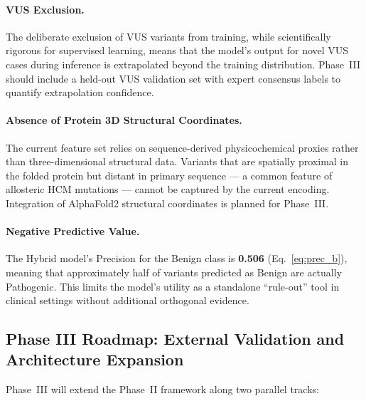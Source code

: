 \documentclass[12pt,a4paper]{article}
\begin{document}
\paragraph{VUS Exclusion.}
The deliberate exclusion of VUS variants from training, while scientifically
rigorous for supervised learning, means that the model's output for novel
VUS cases during inference is extrapolated beyond the training distribution.
Phase~III should include a held-out VUS validation set with expert consensus
labels to quantify extrapolation confidence.

\paragraph{Absence of Protein 3D Structural Coordinates.}
The current feature set relies on sequence-derived physicochemical proxies
rather than three-dimensional structural data. Variants that are spatially
proximal in the folded protein but distant in primary sequence — a common
feature of allosteric HCM mutations — cannot be captured by the current
encoding. Integration of AlphaFold2 structural coordinates is planned for
Phase~III.

\paragraph{Negative Predictive Value.}
The Hybrid model's Precision for the Benign class is \textbf{0.506}
(Eq.~\ref{eq:prec_b}), meaning that approximately half of variants
predicted as Benign are actually Pathogenic. This limits the model's utility
as a standalone ``rule-out'' tool in clinical settings without additional
orthogonal evidence.

\subsection{Phase III Roadmap: External Validation and Architecture Expansion}
\label{subsec:phase3}

Phase~III will extend the Phase~II framework along two parallel tracks:
\end{document}
